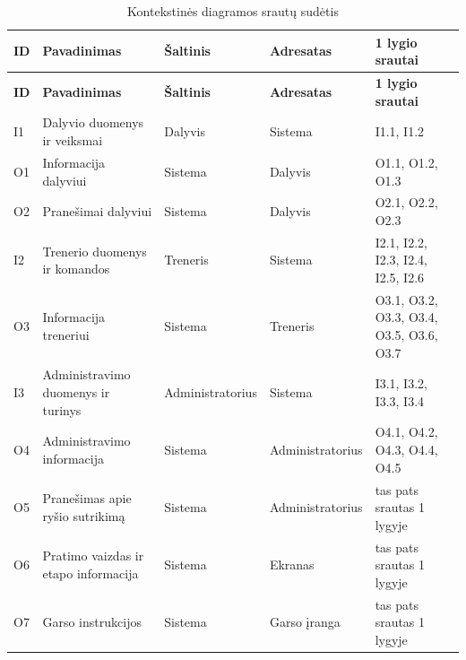 \begingroup
\small
\begin{longtable}{@{}>{\raggedright\arraybackslash}p{0.9cm}>{\raggedright\arraybackslash}p{5.0cm}>{\raggedright\arraybackslash}p{2.4cm}>{\raggedright\arraybackslash}p{2.4cm}>{\raggedright\arraybackslash}p{3.6cm}@{}}
\caption{Kontekstinės diagramos srautų sudėtis}\label{tab:dfd-0}\\
\toprule
\textbf{ID} & \textbf{Pavadinimas} & \textbf{Šaltinis} & \textbf{Adresatas} & \textbf{1 lygio srautai} \\
\midrule
\endfirsthead
\toprule
\textbf{ID} & \textbf{Pavadinimas} & \textbf{Šaltinis} & \textbf{Adresatas} & \textbf{1 lygio srautai} \\
\midrule
\endhead
I1 & Dalyvio duomenys ir veiksmai & Dalyvis & Sistema & I1.1, I1.2 \\
O1 & Informacija dalyviui & Sistema & Dalyvis & O1.1, O1.2, O1.3 \\
O2 & Pranešimai dalyviui & Sistema & Dalyvis & O2.1, O2.2, O2.3 \\
I2 & Trenerio duomenys ir komandos & Treneris & Sistema & I2.1, I2.2, I2.3, I2.4, I2.5, I2.6 \\
O3 & Informacija treneriui & Sistema & Treneris & O3.1, O3.2, O3.3, O3.4, O3.5, O3.6, O3.7 \\
I3 & Administravimo duomenys ir turinys & Administratorius & Sistema & I3.1, I3.2, I3.3, I3.4 \\
O4 & Administravimo informacija & Sistema & Administratorius & O4.1, O4.2, O4.3, O4.4, O4.5 \\
O5 & Pranešimas apie ryšio sutrikimą & Sistema & Administratorius & tas pats srautas 1 lygyje \\
O6 & Pratimo vaizdas ir etapo informacija & Sistema & Ekranas & tas pats srautas 1 lygyje \\
O7 & Garso instrukcijos & Sistema & Garso įranga & tas pats srautas 1 lygyje \\
\bottomrule
\end{longtable}
\endgroup

